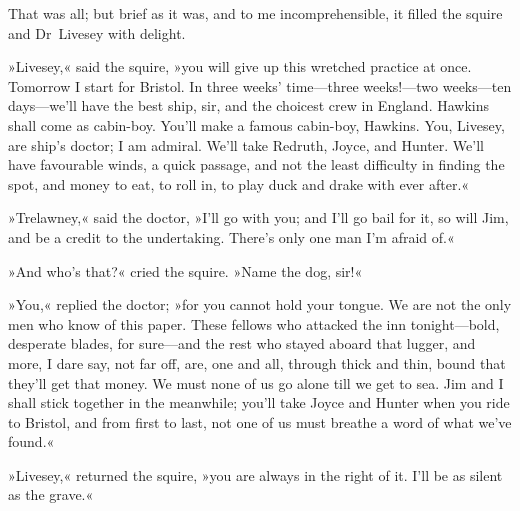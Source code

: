 That was all; but brief as it was, and to me incomprehensible, it filled the squire and Dr~Livesey with delight.

»Livesey,« said the squire, »you will give up this wretched practice at once. Tomorrow I start for Bristol. In three weeks' time—three weeks!—two weeks—ten days—we'll have the best ship, sir, and the choicest crew in England. Hawkins shall come as cabin-boy. You'll make a famous cabin-boy, Hawkins. You, Livesey, are ship's doctor; I am admiral. We'll take Redruth, Joyce, and Hunter. We'll have favourable winds, a quick passage, and not the least difficulty in finding the spot, and money to eat, to roll in, to play duck and drake with ever after.«

»Trelawney,« said the doctor, »I'll go with you; and I'll go bail for it, so will Jim, and be a credit to the undertaking. There's only one man I'm afraid of.«

»And who's that?« cried the squire. »Name the dog, sir!«

»You,« replied the doctor; »for you cannot hold your tongue. We are not the only men who know of this paper. These fellows who attacked the inn tonight—bold, desperate blades, for sure—and the rest who stayed aboard that lugger, and more, I dare say, not far off, are, one and all, through thick and thin, bound that they'll get that money. We must none of us go alone till we get to sea. Jim and I shall stick together in the meanwhile; you'll take Joyce and Hunter when you ride to Bristol, and from first to last, not one of us must breathe a word of what we've found.«

»Livesey,« returned the squire, »you are always in the right of it. I'll be as silent as the grave.«
